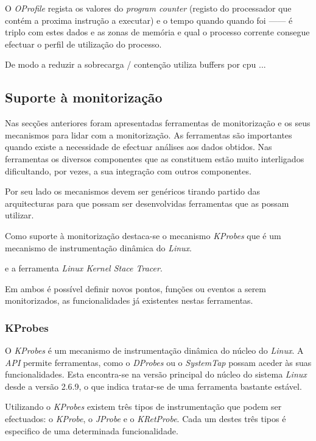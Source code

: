 O \textit{OProfile} regista os valores do \textit{program counter} (registo do processador que contém a proxima instrução a executar) e o tempo quando quando foi  ------ é triplo com estes dados e as zonas de memória e qual o processo corrente consegue efectuar o perfil de utilização do processo.

De modo a reduzir a sobrecarga / contenção utiliza buffers por cpu ... 



\subsection{Suporte à monitorização}

Nas secções anteriores foram apresentadas ferramentas de monitorização e os seus mecanismos para lidar com a monitorização.
As ferramentas são importantes quando existe a necessidade de efectuar análises aos dados obtidos.
Nas ferramentas os diversos componentes que as constituem estão muito interligados dificultando, por vezes, a sua integração com outros componentes.

Por seu lado os mecanismos devem ser genéricos tirando partido das arquitecturas para que possam ser desenvolvidas ferramentas que as possam utilizar.


Como suporte à monitorização destaca-se o mecanismo \textit{KProbes} que é um mecanismo de instrumentação dinâmica do \textit{Linux}.


e a ferramenta \textit{Linux Kernel Stace Tracer}.

Em \todo{} ambos é possível definir novos pontos, funções ou eventos a serem monitorizados, as funcionalidades já existentes nestas ferramentas.

\subsubsection{KProbes}\label{sect:KProbes_overview}

O \textit{KProbes} é um mecanismo de instrumentação dinâmica do núcleo do \textit{Linux}.
A \textit{API} permite ferramentas, como o \textit{DProbes} ou o \textit{SystemTap} possam aceder às suas funcionalidades.
Esta encontra-se na versão principal do núcleo do sistema \textit{Linux} desde a versão 2.6.9, o que indica tratar-se de uma ferramenta bastante estável\cite{kernel_debug_printk_on_fly,KProbesSite}.

Utilizando o \textit{KProbes} existem três tipos de instrumentação que podem ser efectuados: o \textit{KProbe}, o \textit{JProbe} e o \textit{KRetProbe}.
Cada um destes três tipos é especifico de uma determinada funcionalidade.

